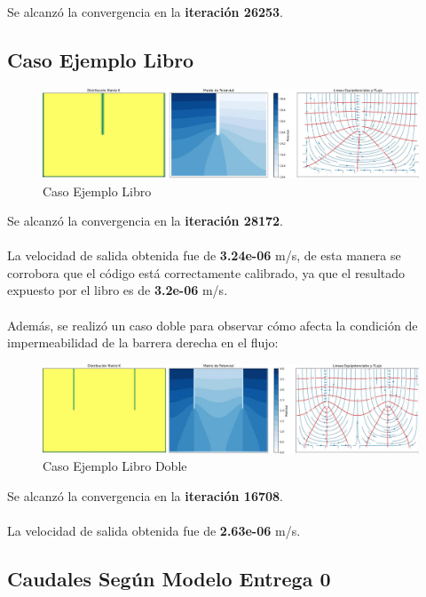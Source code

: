 Se alcanzó la convergencia en la \textbf{iteración 26253}.

\subsection{Caso Ejemplo Libro}

\begin{figure}[H]
    \centering
    \includegraphics[width=1\textwidth]{GRAFICOS/laplace_caso_ejemplo.jpg}
    \caption{Caso Ejemplo Libro}
    \label{fig:caso_ejemplo}
\end{figure}

Se alcanzó la convergencia en la \textbf{iteración 28172}.
\\ \\
La velocidad de salida obtenida fue de \textbf{3.24e-06} m/s, de esta manera se corrobora que el código está correctamente calibrado, ya que el resultado expuesto por el libro es de \textbf{3.2e-06} m/s.
\\ \\
Además, se realizó un caso doble para observar cómo afecta la condición de impermeabilidad de la barrera derecha en el flujo:

\begin{figure}[H]
    \centering
    \includegraphics[width=1\textwidth]{GRAFICOS/laplace_caso_ejemplo_doble.jpg}
    \caption{Caso Ejemplo Libro Doble}
    \label{fig:caso_ejemplo_doble}
\end{figure}

Se alcanzó la convergencia en la \textbf{iteración 16708}.
\\ \\
La velocidad de salida obtenida fue de \textbf{2.63e-06} m/s.

\subsection{Caudales Según Modelo Entrega 0}

